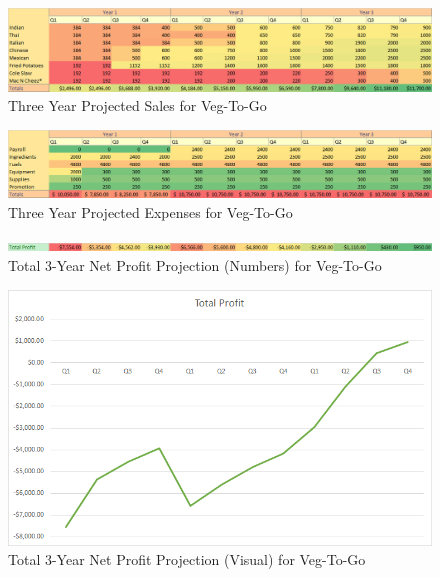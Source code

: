 \documentclass[12pt, letterpaper]{article}
\newcommand{\companyname}{Veg-To-Go}
\begin{document}
\begin{figure}[H]
	\label{products}
	\caption{Three Year Projected Sales for \companyname{}}
	\includegraphics[width=\textwidth]{SalesNumbers}
\end{figure}

\begin{figure}[H]
	\caption{Three Year Projected Expenses for \companyname{}}
	\includegraphics[width=\textwidth]{ExpensesNumbers}
\end{figure}

\begin{figure}[H]
	\caption{Total 3-Year Net Profit Projection (Numbers) for \companyname{}}
	\includegraphics[width=\textwidth]{TotalProfitNumbers}
\end{figure}

\begin{figure}[H]
	\caption{Total 3-Year Net Profit Projection (Visual) for \companyname{}}
	\includegraphics[width=\textwidth]{TotalProfit}
\end{figure}

\newpage
\end{document}
